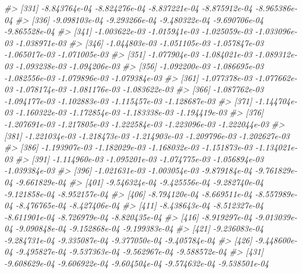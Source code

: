 \documentclass[
]{article}
\newenvironment{Shaded}{\begin{snugshade}}{\end{snugshade}}
\newcommand{\CommentTok}[1]{\textcolor[rgb]{0.56,0.35,0.01}{\textit{#1}}}
\begin{document}
\begin{Shaded}
\begin{Highlighting}[]
\CommentTok{\#\textgreater{} [331] {-}8.843764e{-}04 {-}8.824276e{-}04 {-}8.837221e{-}04 {-}8.875912e{-}04 {-}8.965386e{-}04}
\CommentTok{\#\textgreater{} [336] {-}9.098103e{-}04 {-}9.293266e{-}04 {-}9.480322e{-}04 {-}9.690706e{-}04 {-}9.865528e{-}04}
\CommentTok{\#\textgreater{} [341] {-}1.003622e{-}03 {-}1.015941e{-}03 {-}1.025059e{-}03 {-}1.033096e{-}03 {-}1.038971e{-}03}
\CommentTok{\#\textgreater{} [346] {-}1.044803e{-}03 {-}1.051105e{-}03 {-}1.057847e{-}03 {-}1.065017e{-}03 {-}1.071005e{-}03}
\CommentTok{\#\textgreater{} [351] {-}1.077904e{-}03 {-}1.084021e{-}03 {-}1.089312e{-}03 {-}1.093238e{-}03 {-}1.094206e{-}03}
\CommentTok{\#\textgreater{} [356] {-}1.092200e{-}03 {-}1.086695e{-}03 {-}1.082556e{-}03 {-}1.079896e{-}03 {-}1.079384e{-}03}
\CommentTok{\#\textgreater{} [361] {-}1.077378e{-}03 {-}1.077662e{-}03 {-}1.078174e{-}03 {-}1.081176e{-}03 {-}1.083622e{-}03}
\CommentTok{\#\textgreater{} [366] {-}1.087762e{-}03 {-}1.094177e{-}03 {-}1.102883e{-}03 {-}1.115457e{-}03 {-}1.128687e{-}03}
\CommentTok{\#\textgreater{} [371] {-}1.144704e{-}03 {-}1.160322e{-}03 {-}1.172854e{-}03 {-}1.183338e{-}03 {-}1.194419e{-}03}
\CommentTok{\#\textgreater{} [376] {-}1.207691e{-}03 {-}1.217805e{-}03 {-}1.222584e{-}03 {-}1.223096e{-}03 {-}1.222044e{-}03}
\CommentTok{\#\textgreater{} [381] {-}1.221034e{-}03 {-}1.218473e{-}03 {-}1.214903e{-}03 {-}1.209796e{-}03 {-}1.202627e{-}03}
\CommentTok{\#\textgreater{} [386] {-}1.193907e{-}03 {-}1.182029e{-}03 {-}1.168032e{-}03 {-}1.151873e{-}03 {-}1.134021e{-}03}
\CommentTok{\#\textgreater{} [391] {-}1.114960e{-}03 {-}1.095201e{-}03 {-}1.074775e{-}03 {-}1.056894e{-}03 {-}1.039384e{-}03}
\CommentTok{\#\textgreater{} [396] {-}1.021631e{-}03 {-}1.003054e{-}03 {-}9.879184e{-}04 {-}9.761829e{-}04 {-}9.661829e{-}04}
\CommentTok{\#\textgreater{} [401] {-}9.546324e{-}04 {-}9.425556e{-}04 {-}9.282740e{-}04 {-}9.121858e{-}04 {-}8.952157e{-}04}
\CommentTok{\#\textgreater{} [406] {-}8.794120e{-}04 {-}8.669511e{-}04 {-}8.557989e{-}04 {-}8.476765e{-}04 {-}8.427406e{-}04}
\CommentTok{\#\textgreater{} [411] {-}8.438643e{-}04 {-}8.512327e{-}04 {-}8.611901e{-}04 {-}8.726979e{-}04 {-}8.820435e{-}04}
\CommentTok{\#\textgreater{} [416] {-}8.919297e{-}04 {-}9.013039e{-}04 {-}9.090848e{-}04 {-}9.152868e{-}04 {-}9.199383e{-}04}
\CommentTok{\#\textgreater{} [421] {-}9.236083e{-}04 {-}9.284731e{-}04 {-}9.335087e{-}04 {-}9.377050e{-}04 {-}9.405784e{-}04}
\CommentTok{\#\textgreater{} [426] {-}9.448600e{-}04 {-}9.495827e{-}04 {-}9.537363e{-}04 {-}9.562967e{-}04 {-}9.588572e{-}04}
\CommentTok{\#\textgreater{} [431] {-}9.608629e{-}04 {-}9.606922e{-}04 {-}9.604504e{-}04 {-}9.574632e{-}04 {-}9.538501e{-}04}

\end{Highlighting}
\end{Shaded}
\end{document}
